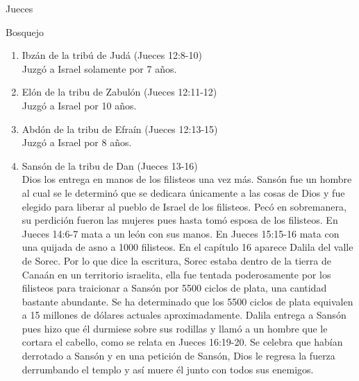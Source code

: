 \begin{section}{Jueces}
\begin{subsection}{Bosquejo}
\begin{enumerate}
\begin{enumerate}
\item Ibzán de la tribú de Judá (Jueces 12:8-10)\\
	Juzgó a Israel solamente por 7 años.
\item Elón de la tribu de Zabulón (Jueces 12:11-12)\\
	Juzgó a Israel por 10 años.
\item Abdón de la tribu de Efraín (Jueces 12:13-15)\\
	Juzgó a Israel por 8 años.
\item Sansón de la tribu de Dan (Jueces 13-16)\\
	Dios los entrega en manos de los filisteos una vez más. Sansón fue un hombre al cual se le determinó que se dedicara únicamente a las cosas de Dios y fue elegido para liberar al pueblo de Israel de los filisteos. Pecó en sobremanera, su perdición fueron las mujeres pues hasta tomó esposa de los filisteos. En Jueces 14:6-7 mata a un león con sus manos. En Jueces 15:15-16 mata con una quijada de asno a 1000 filisteos. En el capítulo 16 aparece Dalila del valle de Sorec. Por lo que dice la escritura, Sorec estaba dentro de la tierra de Canaán en un territorio israelita, ella fue tentada poderosamente por los filisteos para traicionar a Sansón por 5500 ciclos de plata, una cantidad bastante abundante. Se ha determinado que los 5500 ciclos de plata equivalen a 15 millones de dólares actuales aproximadamente. Dalila entrega a Sansón pues hizo que él durmiese sobre sus rodillas y llamó a un hombre que le cortara el cabello, como se relata en Jueces 16:19-20. Se celebra que habían derrotado a Sansón y en una petición de Sansón, Dios le regresa la fuerza derrumbando el templo y así muere él junto con todos sus enemigos.
							

\end{enumerate}
\end{enumerate}
\end{subsection}
\end{section}
